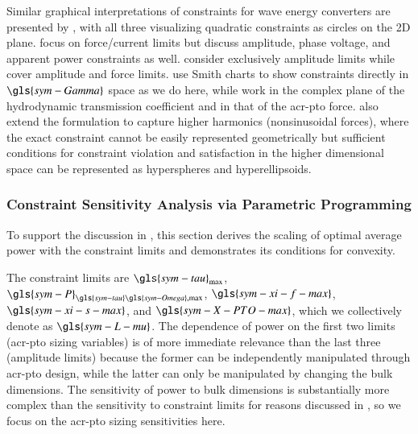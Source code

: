 Similar graphical interpretations of constraints for wave energy converters are presented by \citet{mccabe_force-limited_2024,merigaud_geometrical_2023,bacelli_geometric_2013}, with all three visualizing quadratic constraints as circles on the 2D plane.
\citet{mccabe_force-limited_2024} focus on force/current limits but discuss amplitude, phase voltage, and apparent power constraints as well.
\citet{merigaud_geometrical_2023} consider exclusively amplitude limits while \citet{bacelli_geometric_2013} cover amplitude and force limits.
\citet{mccabe_force-limited_2024} use Smith charts to show constraints directly in $\gls{sym-Gamma}$ space as we do here, while \citet{merigaud_geometrical_2023} work in the complex plane of the hydrodynamic transmission coefficient and \citet{bacelli_geometric_2013} in that of the \gls{acr-pto} force.
\citet{bacelli_geometric_2013} also extend the formulation to capture higher harmonics (nonsinusoidal forces), where the exact constraint cannot be easily represented geometrically but sufficient conditions for constraint violation and satisfaction in the higher dimensional space can be represented as hyperspheres and hyperellipsoids.


\subsubsection{Constraint Sensitivity Analysis via Parametric Programming}
\label{sec:appendix-constraint-sensitivity}
To support the discussion in , this section derives the scaling of optimal average power with the constraint limits and demonstrates its conditions for convexity.

The constraint limits are
$\gls{sym-tau}_{\text{max}}$, $\gls{sym-P}_{\gls{sym-tau}\gls{sym-Omega},\text{max}}$, $\gls{sym-xi-f-max}$, $\gls{sym-xi-s-max}$, and $\gls{sym-X-PTO-max}$, which we collectively denote as $\gls{sym-L-mu}$.
The dependence of power on the first two limits (\gls{acr-pto} sizing variables) is of more immediate relevance than the last three (amplitude limits) because the former can be independently manipulated through \gls{acr-pto} design, while the latter can only be manipulated by changing the bulk dimensions.
The sensitivity of power to bulk dimensions is substantially more complex than the sensitivity to constraint limits for reasons discussed in , so we focus on the \gls{acr-pto} sizing sensitivities here.

